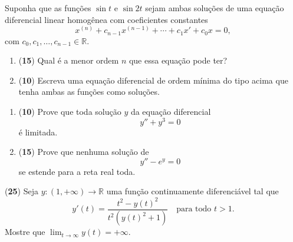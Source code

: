 \documentclass[10pt,a4paper]{amsart}
\newcommand{\R}{\mathbb{R}}
\begin{document}
 Suponha que as funções $\sin t$ e $\sin 2t$ sejam ambas soluções de uma equação diferencial linear homogênea com coeficientes constantes
\[
    x^{(n)} + c_{n-1} x^{(n-1)} + \cdots + c_1 x' + c_0 x = 0,
\]
com $c_0, c_1, \ldots, c_{n-1} \in \R$.
\begin{enumerate}[label=(\alph*)]
    \item ({\bf 15}) Qual é a menor ordem $n$ que essa equação pode ter?
    \item ({\bf 10}) Escreva uma equação diferencial de ordem mínima do tipo acima que tenha ambas as funções como soluções.
\end{enumerate}

\vspace{5mm}


\begin{enumerate}
[label=(\alph*)]

\item ({\bf 10}) Prove que toda solução $y$ da equação diferencial
    \[
    y'' + y^3 = 0
    \]
    é limitada. 

    \item ({\bf 15}) Prove que nenhuma solução de 
    \[
    y'' - e^{y} = 0
    \]
    se estende para a reta real toda. 

    \end{enumerate}

\vspace{5mm}

 ({\bf 25})  Seja $y:(1,+\infty) \to \mathbb{R}$ uma função continuamente diferenciável tal que 
\[
y'(t) = \frac{t^2 - y(t)^2}{t^2(y(t)^2 + 1)} \quad \text{para todo } t > 1. 
\]
Mostre que $\lim_{t \to \infty} y(t) = + \infty.$
\end{document}
